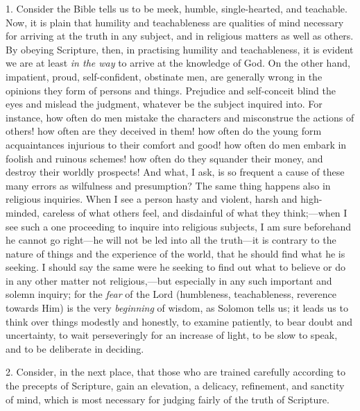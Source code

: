 1. Consider the Bible tells us to be meek, humble, single-hearted,
and teachable. Now, it is plain that humility and teachableness are
qualities of mind necessary for arriving at the truth in any subject,
and in religious matters as well as others. By obeying Scripture,
then, in practising humility and teachableness, it is evident we are
at least \emph{in the way} to arrive at the knowledge of God. On the
other hand, impatient, proud, self-confident, obstinate men, are
generally wrong in the opinions they form of persons and things.
Prejudice and self-conceit blind the eyes and mislead the judgment,
whatever be the subject inquired into. For instance, how often do men
mistake the characters and misconstrue the actions of others! how
often are they deceived in them! how often do the young form
acquaintances injurious to their comfort and good! how often do men
embark in foolish and ruinous schemes! how often do they squander
their money, and destroy their worldly prospects! And what, I ask, is
so frequent a cause of these many errors as wilfulness and
presumption? The same thing happens also in religious inquiries. When
I see a person hasty and violent, harsh and high-minded, careless of
what others feel, and disdainful of what they think;—when I see such
a one proceeding to inquire into religious subjects, I am sure
beforehand he cannot go right—he will not be led into all the truth—it
is contrary to the nature of things and the experience of the world,
that he should find what he is seeking. I should say the same were he
seeking to find out what to believe or do in any other matter not
religious,—but especially in any such important and solemn inquiry;
for the \emph{fear} of the Lord (humbleness, teachableness, reverence
towards Him) is the very \emph{beginning} of wisdom, as Solomon tells
us; it leads us to think over things modestly and honestly, to examine
patiently, to bear doubt and uncertainty, to wait perseveringly for an
increase of light, to be slow to speak, and to be deliberate in
deciding.

2. Consider, in the next place, that those who are trained
carefully according to the precepts of Scripture, gain an elevation, a
delicacy, refinement, and sanctity of mind, which is most necessary
for judging fairly of the truth of Scripture.

